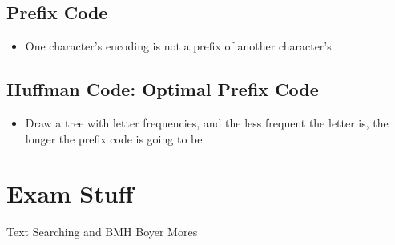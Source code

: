 \documentclass{article}
\begin{document}
\subsection{Prefix Code}
\label{sec:org131b200}
\begin{itemize}
\item One character's encoding is not a prefix of another character's
\end{itemize}
\subsection{Huffman Code: Optimal Prefix Code}
\label{sec:org691c1c1}
\begin{itemize}
\item Draw a tree with letter frequencies, and the less frequent the letter is, the longer the prefix code is going to be.
\end{itemize}

\section{Exam Stuff}
\label{sec:org37dde55}
Text Searching and BMH Boyer Mores
\end{document}
